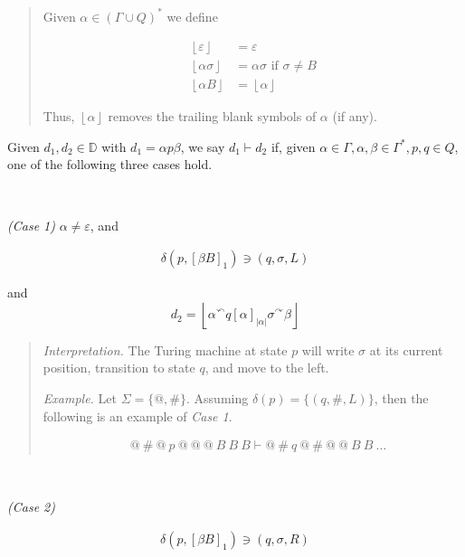 \documentclass[a4paper, 12pt]{article}
\begin{document}
\small
\begin{quote}

Given $\alpha \in (\Gamma \cup Q)^*$ we define 

\begin{align*}
    \left\lfloor \varepsilon \right\rfloor  &= \varepsilon \\ 
    \left\lfloor \alpha \sigma  \right\rfloor  &= \alpha \sigma \text{   if } \sigma \neq B \\ 
    \left\lfloor \alpha B \right\rfloor &= \left\lfloor  \alpha \right\rfloor
\end{align*}

Thus, $\left\lfloor \alpha \right\rfloor$ removes the trailing blank symbols of $\alpha$ (if any).
\end{quote}
\normalsize 

Given $d_1, d_2 \in \mathbb{D}$ with $d_1 = \alpha p \beta $, we say $d_1 \vdash
d_2$ if, given $\alpha \in \Gamma, \alpha, \beta \in  \Gamma^*, p, q \in Q$, one
of the following three cases hold.

~

\textit{(Case 1)} $\alpha \neq \varepsilon$, and

\begin{align*}
    \delta \left( p, \left[ \beta B \right]_1  \right) \ni (q, \sigma, L)
\end{align*}

and 
$$d_2 = \left\lfloor \alpha {}^{\curvearrowleft} q [\alpha]_{|\alpha|} \sigma
{}^{\curvearrowright} \beta  \right\rfloor$$

\small 
\begin{quote}
    \textit{Interpretation.} The Turing machine at state $p$ will write $\sigma$
    at its current position, transition to state $q$, and move to the left. 

    \textit{Example.} Let $\Sigma = \{ @, \#\}$. Assuming $\delta (p) = \{ (q,
    \#, L) \}$, then the following is an example of
    \textit{Case 1}.
    
    \begin{align*}
        &@ ~ \# ~ @ ~ p ~ @ ~ @ ~ @ ~ B ~ B ~ B \vdash  @ ~ \# ~q ~ @ ~ \# ~ @ ~ @ ~ B ~ B
        ~ \ldots
    \end{align*}
\end{quote}
\normalsize 

~ 

\textit{(Case 2)} 

\begin{align*}
    \delta \left( p, \left[ \beta B \right]_1  \right) \ni (q, \sigma, R)
\end{align*}
\end{document}
